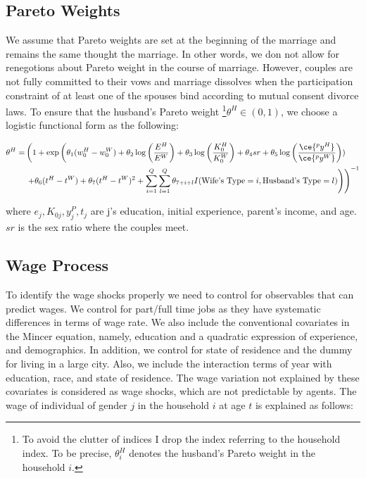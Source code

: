 \subsection{Pareto Weights}

 We assume that Pareto weights are set at the beginning of the marriage and remains the same thought the marriage. In other words, we don not allow for renegotions about Pareto weight in the course of marriage. However, couples are not fully committed to their vows and marriage dissolves when the participation constraint of at least one of the spouses bind according to mutual consent divorce laws. To ensure that the husband's Pareto weight \footnote {To avoid the clutter of indices I drop the index referring to the household index. To be precise, $\theta_i^H$ denotes the husband's Pareto weight in the household $i$.}$\theta^H \in (0,1)$, we choose a logistic functional form as the following: 

\begin{align*}
\theta^H = & \left ( 1 + \exp \left( \theta_1 (w^H_{0} - w^W_{0}) + \theta_2 \log \left( \dfrac{E^H}{E^W} \right) + \theta_3 \log \left ( \dfrac{K^H_{0}}{K^W_{0}}\right ) + \theta_4 sr +\theta_5 \log \left ( \dfrac{\ce{^p y^H}}{\ce{^p y^W}}\right ) )\right. \right. \\
& \left. \left. + \theta_6 (t^H - t^W) + \theta_7 (t^H - t^W)^2 +  \sum \limits_{i=1}^{Q} \sum \limits_{l=1}^{Q} \theta_{7+i+l} I(\text{Wife's Type} = i, \text{Husband's Type} = l)   \right )\right )^{-1}
\end{align*}

where \( e_j, K_{0j}, y_j^P, t_j\) are j's education, initial experience, parent's income, and age. $sr$ is the sex ratio where the couples meet. \\

\subsection{Wage Process}

To identify the wage shocks properly we need to control for observables that can predict wages. We control for part/full time jobs as they have systematic differences in terms of wage rate. We also include the conventional covariates in the Mincer equation, namely, education and a quadratic expression of experience, and demographics. In addition, we control for state of residence and the dummy for living in a large city. Also, we include the interaction terms of year with education, race, and state of residence.  
 The wage variation not explained by these covariates is considered as wage shocks, which are not predictable by agents. The wage of individual of gender $j$ in the household $i$ at age $t$ is explained as follows: 

